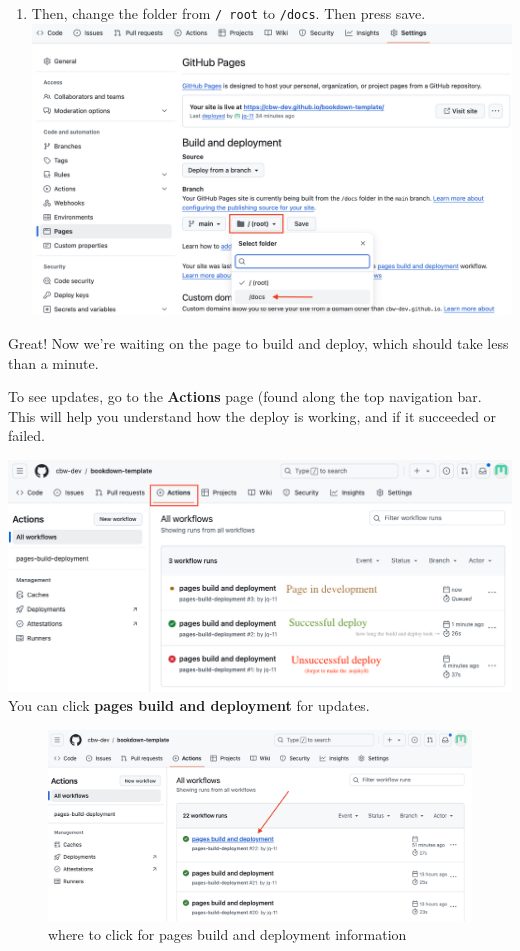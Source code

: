 \documentclass[
]{book}
\theoremstyle{definition}
\theoremstyle{definition}
\theoremstyle{definition}
\theoremstyle{definition}
\theoremstyle{remark}
\begin{document}
\begin{enumerate}
\item
  Then, change the folder from \texttt{/\ root} to \texttt{/docs}. Then press save.
  \includegraphics{img/git-instruct/github-deploy-docs.png}\\
\end{enumerate}

Great! Now we're waiting on the page to build and deploy, which should take less than a minute.

To see updates, go to the \textbf{Actions} page (found along the top navigation bar. This will help you understand how the deploy is working, and if it succeeded or failed.

\includegraphics{img/git-instruct/github-pages-actions-explained.png}\\

You can click \textbf{pages build and deployment} for updates.

\begin{figure}
\centering
\includegraphics{img/git-instruct/pages-build-and-deployment.png}
\caption{where to click for pages build and deployment information}
\end{figure}
\end{document}
